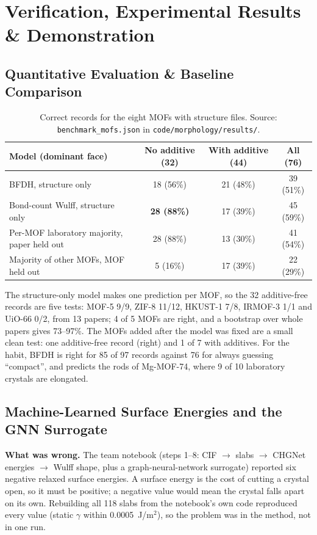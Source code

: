 \documentclass[11pt, a4paper]{article}
\begin{document}
\section{Verification, Experimental Results \& Demonstration}

\subsection{Quantitative Evaluation \& Baseline Comparison}
\begin{table}[H]
    \centering
    \footnotesize
    \renewcommand{\arraystretch}{1.2}
    \begin{tabular}{|p{5.4cm}|c|c|c|}
        \hline
        \textbf{Model (dominant face)} & \textbf{No additive (32)} & \textbf{With additive (44)} & \textbf{All (76)} \\
        \hline
        BFDH, structure only & 18 (56\%) & 21 (48\%) & 39 (51\%) \\
        \hline
        Bond-count Wulff, structure only & \textbf{28 (88\%)} & 17 (39\%) & 45 (59\%) \\
        \hline
        Per-MOF laboratory majority, paper held out & 28 (88\%) & 13 (30\%) & 41 (54\%) \\
        \hline
        Majority of other MOFs, MOF held out & 5 (16\%) & 17 (39\%) & 22 (29\%) \\
        \hline
    \end{tabular}
    \caption{Correct records for the eight MOFs with structure files. Source: \texttt{benchmark\_mofs.json} in \texttt{code/morphology/results/}.}
\end{table}
\noindent
The structure-only model makes one prediction per MOF, so the 32 additive-free records are five tests: MOF-5 9/9, ZIF-8 11/12, HKUST-1 7/8, IRMOF-3 1/1 and UiO-66 0/2, from 13 papers; 4 of 5 MOFs are right, and a bootstrap over whole papers gives 73--97\%. The MOFs added after the model was fixed are a small clean test: one additive-free record (right) and 1 of 7 with additives. For the habit, BFDH is right for 85 of 97 records against 76 for always guessing ``compact'', and predicts the rods of Mg-MOF-74, where 9 of 10 laboratory crystals are elongated.

\subsection{Machine-Learned Surface Energies and the GNN Surrogate}
\textbf{What was wrong.} The team notebook (steps 1--8: CIF $\to$ slabs $\to$ CHGNet energies $\to$ Wulff shape, plus a graph-neural-network surrogate) reported six negative relaxed surface energies. A surface energy is the cost of cutting a crystal open, so it must be positive; a negative value would mean the crystal falls apart on its own. Rebuilding all 118 slabs from the notebook's own code reproduced every value (static $\gamma$ within 0.0005~J/m$^2$), so the problem was in the method, not in one run.
\end{document}
